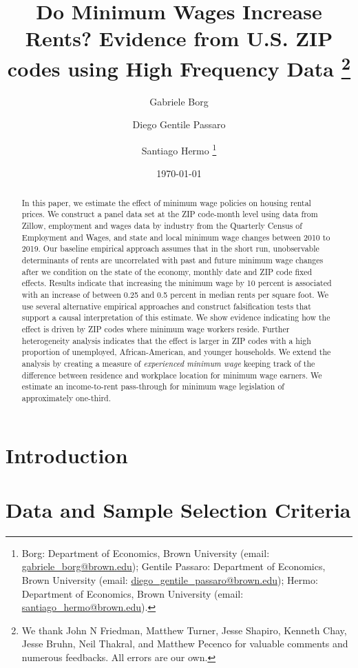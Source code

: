 \documentclass{article}
\title{Do Minimum Wages Increase Rents? 
	   Evidence from U.S. ZIP codes using High Frequency Data 
	   \thanks{We thank John N Friedman, Matthew Turner, Jesse Shapiro, Kenneth Chay, Jesse Bruhn, Neil Thakral, and Matthew Pecenco for valuable comments and 
   numerous feedbacks. All errors are our own.}}
\author{Gabriele Borg \and Diego Gentile Passaro \and Santiago Hermo
		\footnote{Borg: Department of Economics, Brown University (email: 
		\url{gabriele_borg@brown.edu}); 
		Gentile Passaro: Department of Economics, Brown University (email: 
		\url{diego_gentile_passaro@brown.edu}); 
		Hermo: Department of Economics, Brown University (email: 
		\url{santiago_hermo@brown.edu}).}
		}
\date{\today}
\begin{document}
\maketitle

\begin{abstract}
    \noindent
    In this paper, we estimate the effect of minimum wage policies on housing rental 
    prices. We construct a panel data set at the ZIP code-month level using 
    data from Zillow, employment and wages data by industry  from the Quarterly Census of 
    Employment and Wages, and state and local minimum wage changes between 2010 to 2019. 
    Our baseline empirical approach assumes that in the short run, unobservable determinants of 
    rents are uncorrelated with past and future minimum wage changes after we condition on  
    the state of the economy, monthly date and ZIP code fixed effects.  Results indicate that increasing 
    the minimum wage by 10 percent is associated with an increase of between 0.25 and 0.5 percent in 
    median rents per square foot. We use several alternative empirical approaches and construct 
    falsification tests that support a causal interpretation of this estimate. We show 
    evidence indicating how the effect is driven by ZIP codes where minimum wage workers 
    reside. Further heterogeneity analysis indicates that the effect is larger in ZIP codes 
    with a high proportion of unemployed, African-American, and younger households. We 
    extend the analysis by creating a measure of \textit{experienced minimum wage} keeping track 
    of the difference between residence and workplace location for minimum wage earners. We 
    estimate an income-to-rent pass-through for minimum wage legislation of approximately one-third. 
\end{abstract}

\vspace{5mm}

\maketitle


\clearpage

\section{Introduction}\label{sec:intro}
    

\section{Data and Sample Selection Criteria}\label{sec:data}
	
\end{document}
